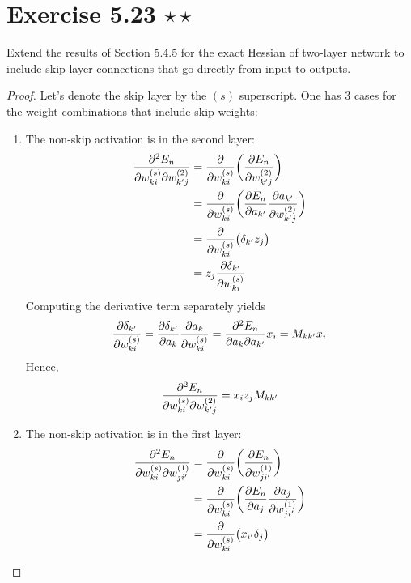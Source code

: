 \section*{Exercise 5.23 $\star \star$}
Extend the results of Section 5.4.5 for the exact Hessian of two-layer network
to include skip-layer connections that go directly from input to outputs.

\vspace{1em}

\begin{proof}
    Let's denote the skip layer by the $(s)$ superscript. One has 3 cases for
    the weight combinations that include skip weights:
    \begin{enumerate}
        \item The non-skip activation is in the second layer:
            \begin{align*}
                \pdv{E_n}{w_{ki}^{(s)}}{w_{k'j}^{(2)}}
                &= \pdv{w_{ki}^{(s)}} \bigg(\pdv{E_n}{w_{k'j}^{(2)}}\bigg) \\
                &= \pdv{w_{ki}^{(s)}}\bigg(\pdv{E_n}{a_{k'}} \pdv{a_{k'}}{w_{k'j}^{(2)}}\bigg) \\
                &= \pdv{w_{ki}^{(s)}}\big(\delta_{k'} z_j\big) \\
                &= z_j \pdv{\delta_{k'}}{w_{ki}^{(s)}}
            \end{align*}
            Computing the derivative term separately yields
            \begin{align*}
                \pdv{\delta_{k'}}{w_{ki}^{(s)}}
                = \pdv{\delta_{k'}}{a_k} \pdv{a_k}{w_{ki}^{(s)}}
                = \pdv{E_n}{a_k}{a_{k'}} x_i
                = M_{kk'} x_i
            \end{align*}
            Hence,
            \begin{align*}
                \pdv{E_n}{w_{ki}^{(s)}}{w_{k'j}^{(2)}}
                = x_i z_j M_{kk'}
            \end{align*}
        \item The non-skip activation is in the first layer:
            \begin{align*}
                \pdv{E_n}{w_{ki}^{(s)}}{w_{ji'}^{(1)}}
                &= \pdv{w_{ki}^{(s)}} \bigg(\pdv{E_n}{w_{ji'}^{(1)}}\bigg) \\
                &= \pdv{w_{ki}^{(s)}} \bigg(\pdv{E_n}{a_j} \pdv{a_j}{w_{ji'}^{(1)}}\bigg) \\
                &= \pdv{w_{ki}^{(s)}} \big(x_{i'} \delta_{j}\big) \\

\end{align*}
\end{enumerate}
\end{proof}
